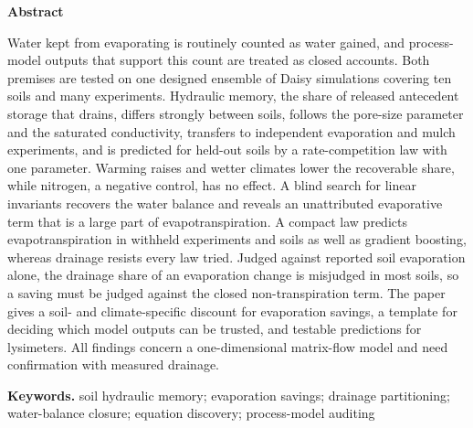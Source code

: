 

\linenumbers
\begin{titlepage}
\vspace*{-1.2cm}
\begin{center}\begin{minipage}{0.92\textwidth}\end{minipage}\end{center}
\vspace{0.4cm}
\authorblock
\vspace{0.4cm}

{\small\setlength{\parindent}{0pt}\setlength{\parskip}{0pt}
\begin{center}\textbf{\normalsize Abstract}\end{center}\vspace{-0.4em}
\noindent Water kept from evaporating is routinely counted as water gained, and process-model outputs that support this count are treated as closed accounts. Both premises are tested on one designed ensemble of Daisy simulations covering ten soils and many experiments. Hydraulic memory, the share of released antecedent storage that drains, differs strongly between soils, follows the pore-size parameter and the saturated conductivity, transfers to independent evaporation and mulch experiments, and is predicted for held-out soils by a rate-competition law with one parameter. Warming raises and wetter climates lower the recoverable share, while nitrogen, a negative control, has no effect. A blind search for linear invariants recovers the water balance and reveals an unattributed evaporative term that is a large part of evapotranspiration. A compact law predicts evapotranspiration in withheld experiments and soils as well as gradient boosting, whereas drainage resists every law tried. Judged against reported soil evaporation alone, the drainage share of an evaporation change is misjudged in most soils, so a saving must be judged against the closed non-transpiration term. The paper gives a soil- and climate-specific discount for evaporation savings, a template for deciding which model outputs can be trusted, and testable predictions for lysimeters. All findings concern a one-dimensional matrix-flow model and need confirmation with measured drainage.

\medskip\noindent \textbf{Keywords.} soil hydraulic memory; evaporation savings; drainage partitioning; water-balance closure; equation discovery; process-model auditing\par}
\end{titlepage}

